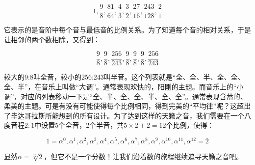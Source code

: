 \documentclass[b5paper]{ctexart}
\begin{document}
\[
1, \frac{9}{8}, \frac{81}{64}, \frac{4}{3}, \frac{3}{2}, \frac{27}{16}, \frac{243}{128}, \frac{2}{1}
\]

它表示的是音阶中每个音与最低音的比例关系。为了知道每个音的相对关系，于是让相邻的两个数相除，又得到：

\[
\frac{9}{8}, \frac{9}{8}, \frac{256}{243}, \frac{9}{8}, \frac{9}{8}, \frac{9}{8}, \frac{256}{243}
\]

较大的9:8叫全音，较小的256:243叫半音。这个列表就是“全、全、半、全、全、全、半”，在音乐上叫做“大调”。通常表现欢快的，阳刚的主题。而音乐上的“小调”，对应的列表移动一下是“全、半、全、全、半、全、全”。通常表现含蓄的、柔美的主题。可是有没有可能使得每个比例相同，得到完美的“平均律”呢？这超出了毕达哥拉斯所能想到的所有设计。为了达到这样的天籁之音，我们需要在一个八度音程$2:1$中设置5个全音，2个半音，共$5 \times 2 + 2 = 12$个比例，使得：

\[
1 = \alpha^0, \alpha^1, \alpha^2, \alpha^3, \alpha^4, \alpha^5, \alpha^6, \alpha^7, \alpha^8, \alpha^9, \alpha^{10}, \alpha^{11}, \alpha^{12} = 2
\]

显然$\alpha = \sqrt[12]{2}$，但它不是一个分数！让我们沿着数的旅程继续追寻天籁之音吧。
\end{document}
